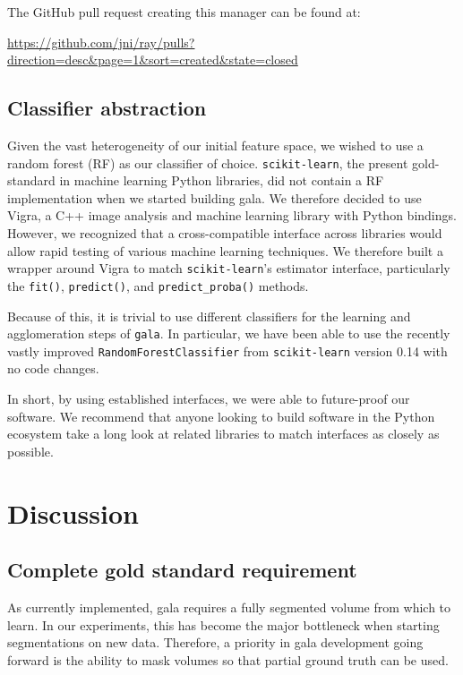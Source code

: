 \documentclass{frontiersSCNS} %
\begin{document}
The GitHub pull request creating this manager can be found at:

\url{https://github.com/jni/ray/pulls?direction=desc&page=1&sort=created&state=closed}

\subsection{Classifier abstraction}

Given the vast heterogeneity of our initial feature space, we wished to use a random forest (RF) as our classifier of choice.
\texttt{\small scikit-learn}, the present gold-standard in machine learning Python libraries, did not contain a RF implementation when we started building gala.
We therefore decided to use Vigra, a C++ image analysis and machine learning library with Python bindings.
However, we recognized that a cross-compatible interface across libraries would allow rapid testing of various machine learning techniques.
We therefore built a wrapper around Vigra to match \texttt{\small scikit-learn}'s estimator interface, particularly the \texttt{\small fit()}, \texttt{\small predict()}, and \texttt{\small predict\_proba()} methods.

Because of this, it is trivial to use different classifiers for the learning and agglomeration steps of \texttt{\small gala}.
In particular, we have been able to use the recently vastly improved \texttt{\small RandomForestClassifier} from \texttt{\small scikit-learn} version 0.14 with no code changes.

In short, by using established interfaces, we were able to future-proof our software.
We recommend that anyone looking to build software in the Python ecosystem take a long look at related libraries to match interfaces as closely as possible.


\section{Discussion}


\subsection{Complete gold standard requirement}

As currently implemented, gala requires a fully segmented volume from which to learn.
In our experiments, this has become the major bottleneck when starting segmentations on new data.
Therefore, a priority in gala development going forward is the ability to mask volumes so that partial ground truth can be used.
\end{document}
